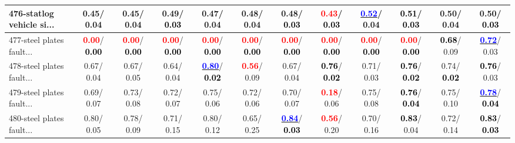\begin{table}[h]
\begin{center}
{\begin{tabular}{lc|c|c|c|c|c|c|c|c|c|c}
476-statlog vehicle si... &   0.45/  0.04 &   0.45/  0.04 &   0.49/\textcolor{black}{\textbf{  0.03}} &   0.47/  0.04 &   0.48/  0.04 &   0.48/\textcolor{black}{\textbf{  0.03}} & \textcolor{red}{\textbf{  0.43}}/\textcolor{black}{\textbf{  0.03}} & \underline{\textcolor{blue}{\textbf{  0.52}}}/  0.04 & \textcolor{black}{\textbf{  0.51}}/\textcolor{black}{\textbf{  0.03}} &   0.50/  0.04 &   0.50/\textcolor{black}{\textbf{  0.03}} \\ \hline
477-steel plates fault... & \textcolor{red}{\textbf{  0.00}}/\textcolor{black}{\textbf{  0.00}} & \textcolor{red}{\textbf{  0.00}}/\textcolor{black}{\textbf{  0.00}} & \textcolor{red}{\textbf{  0.00}}/\textcolor{black}{\textbf{  0.00}} & \textcolor{red}{\textbf{  0.00}}/\textcolor{black}{\textbf{  0.00}} & \textcolor{red}{\textbf{  0.00}}/\textcolor{black}{\textbf{  0.00}} & \textcolor{red}{\textbf{  0.00}}/\textcolor{black}{\textbf{  0.00}} & \textcolor{red}{\textbf{  0.00}}/\textcolor{black}{\textbf{  0.00}} & \textcolor{red}{\textbf{  0.00}}/\textcolor{black}{\textbf{  0.00}} & \textcolor{red}{\textbf{  0.00}}/\textcolor{black}{\textbf{  0.00}} & \textcolor{black}{\textbf{  0.68}}/  0.09 & \underline{\textcolor{blue}{\textbf{  0.72}}}/  0.03 \\
478-steel plates fault... &   0.67/  0.04 &   0.67/  0.05 &   0.64/  0.04 & \underline{\textcolor{blue}{\textbf{  0.80}}}/\textcolor{black}{\textbf{  0.02}} & \textcolor{red}{\textbf{  0.56}}/  0.09 &   0.67/  0.04 & \textcolor{black}{\textbf{  0.76}}/\textcolor{black}{\textbf{  0.02}} &   0.71/  0.03 & \textcolor{black}{\textbf{  0.76}}/\textcolor{black}{\textbf{  0.02}} &   0.74/\textcolor{black}{\textbf{  0.02}} & \textcolor{black}{\textbf{  0.76}}/  0.03 \\
479-steel plates fault... &   0.69/  0.07 &   0.73/  0.08 &   0.72/  0.07 &   0.75/  0.06 &   0.72/  0.06 &   0.70/  0.07 & \textcolor{red}{\textbf{  0.18}}/  0.06 &   0.75/  0.08 & \textcolor{black}{\textbf{  0.76}}/\textcolor{black}{\textbf{  0.04}} &   0.75/  0.10 & \underline{\textcolor{blue}{\textbf{  0.78}}}/\textcolor{black}{\textbf{  0.04}} \\
480-steel plates fault... &   0.80/  0.05 &   0.78/  0.09 &   0.71/  0.15 &   0.80/  0.12 &   0.65/  0.25 & \underline{\textcolor{blue}{\textbf{  0.84}}}/\textcolor{black}{\textbf{  0.03}} & \textcolor{red}{\textbf{  0.56}}/  0.20 &   0.70/  0.16 & \textcolor{black}{\textbf{  0.83}}/  0.04 &   0.72/  0.14 & \textcolor{black}{\textbf{  0.83}}/\textcolor{black}{\textbf{  0.03}} \\\end{tabular}}\label{stratsALCKappa14AllReduxHalfa}
\end{center}
\end{table}
